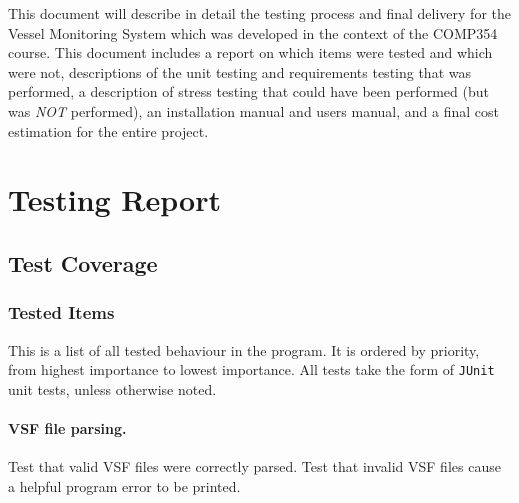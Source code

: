 \documentclass{article}
\begin{document}

This document will describe in detail the testing process and final delivery for the Vessel Monitoring System which was developed in the context of the COMP354 course. This document includes a report on which items were tested and which were not, descriptions of the unit testing and requirements testing that was performed, a description of stress testing that could have been performed (but was \emph{NOT} performed), an installation manual and users manual, and a final cost estimation for the entire project.

\break

\section{Testing Report}


\subsection{Test Coverage}

\subsubsection{Tested Items} %


This is a list of all tested behaviour in the program. It is ordered by priority, from highest importance to lowest importance. All tests take the form of \verb|JUnit| unit tests, unless otherwise noted.

\paragraph{VSF file parsing.} Test that valid VSF files were correctly parsed. Test that invalid VSF files cause a helpful program error to be printed.
\end{document}
